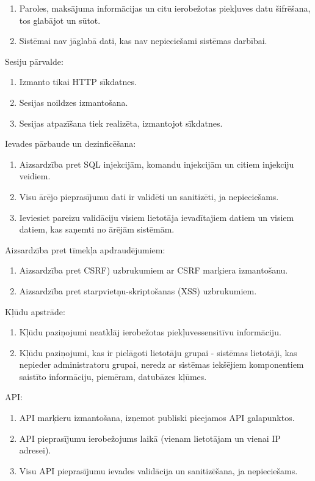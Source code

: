		\begin{enumerate}
            \item Paroles, maksājuma informācijas un citu ierobežotas piekļuves datu šifrēšana, tos glabājot un sūtot.
                \item Sistēmai nav jāglabā dati, kas nav nepieciešami sistēmas darbībai.
		\end{enumerate}
	\item Sesiju pārvalde:
		\begin{enumerate}
\item Izmanto tikai HTTP sīkdatnes.
\item Sesijas noildzes izmantošana.
\item Sesijas atpazīšana tiek realizēta, izmantojot sīkdatnes.
		\end{enumerate}
	\item Ievades pārbaude un dezinficēšana:
		\begin{enumerate}
\item Aizsardzība pret SQL injekcijām, komandu injekcijām un citiem injekciju veidiem.
\item Visu ārējo pieprasījumu dati ir validēti un sanitizēti, ja nepieciešams.
\item Ieviesiet pareizu validāciju visiem lietotāja ievadītajiem datiem un visiem datiem, kas saņemti no ārējām sistēmām.
		\end{enumerate}
	\item Aizsardzība pret tīmekļa apdraudējumiem:
		\begin{enumerate}
\item Aizsardzība pret CSRF) uzbrukumiem ar CSRF marķiera izmantošanu.
\item Aizsardzība pret starpvietņu-skriptošanas (XSS) uzbrukumiem.
		\end{enumerate}
	\item Kļūdu apstrāde:
		\begin{enumerate}
\item Kļūdu paziņojumi neatklāj ierobežotas piekļuvessensitīvu informāciju.
\item Kļūdu paziņojumi, kas ir pielāgoti lietotāju grupai - sistēmas lietotāji, kas nepieder administratoru grupai, neredz ar sistēmas iekšējiem komponentiem saistīto informāciju, piemēram, datubāzes kļūmes.
		\end{enumerate}
	\item API:
		\begin{enumerate}
\item API marķieru izmantošana, izņemot publiski pieejamos API galapunktos.
\item API pieprasījumu ierobežojums laikā (vienam lietotājam un vienai IP adresei).
\item Visu API pieprasījumu ievades validācija un sanitizēšana, ja nepieciešams.
		\end{enumerate}
